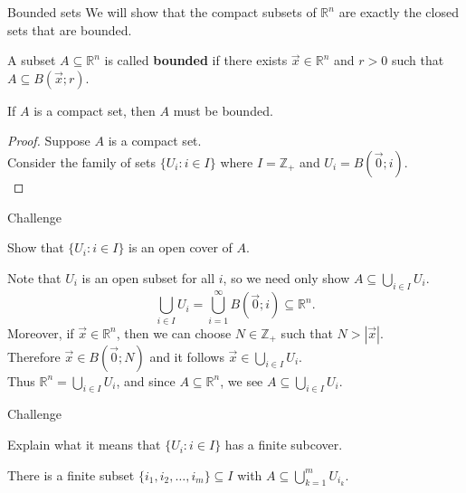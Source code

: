 \documentclass{beamer}
\begin{document}
\begin{frame}{Bounded sets}
\pause
We will show that the compact subsets of $\mathbb{R}^n$ are exactly the closed sets that are bounded.
\pause
\begin{defn}
A subset $A\subseteq\mathbb{R}^n$ is called \textbf{bounded} if there exists $\vec x\in\mathbb{R}^n$ and $r > 0$ such that $A\subseteq B(\vec x; r)$.
\end{defn}
\pause
\begin{thm}
If $A$ is a compact set, then $A$ must be bounded.
\end{thm}
\pause
\begin{proof}
Suppose $A$ is a compact set.\\
\pause
Consider the family of sets $\{U_i: i\in I\}$ where $I=\mathbb{Z}_+$ and $U_i = B(\vec 0; i)$.\\
\end{proof}
\end{frame}

\begin{frame}{Challenge}
\begin{prob}
Show that $\{U_i: i\in I\}$ is an open cover of $A$.
\end{prob}
\pause
\begin{soln}
Note that $U_i$ is an open subset for all $i$, so we need only show $A\subseteq\bigcup_{i\in I} U_i$.\\
\pause
$$\bigcup_{i\in I} U_i = \bigcup_{i=1}^\infty B(\vec 0; i) \subseteq \mathbb{R}^n.$$
\pause
Moreover, if $\vec x\in \mathbb{R}^n$, then we can choose $N\in\mathbb{Z}_+$ such that $N > |\vec x|$.\\
\pause
Therefore $\vec x\in B(\vec 0; N)$ and it follows $\vec x\in \bigcup_{i\in I} U_i$. \\
\pause
Thus $\mathbb{R}^n = \bigcup_{i\in I} U_i$, and since $A\subseteq\mathbb{R}^n$, we see $A\subseteq \bigcup_{i\in I} U_i$.
\end{soln}
\end{frame}

\begin{frame}{Challenge}
\begin{prob}
Explain what it means that $\{U_i: i\in I\}$ has a finite subcover.
\end{prob}
\pause
\begin{soln}
There is a finite subset $\{i_1,i_2,\dots, i_m\}\subseteq I$ with $A\subseteq\bigcup_{k=1}^m U_{i_k}$.
\end{soln}
\end{frame}
\end{document}

